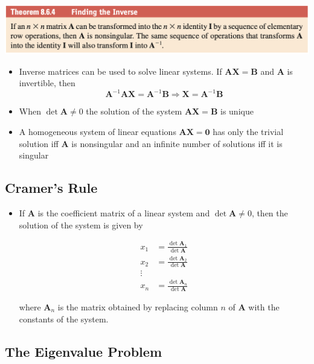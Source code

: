 \documentclass{article}
\begin{document}
\includegraphics[scale=0.443]{row-operations-inverse}

\begin{itemize}
  \item Inverse matrices can be used to solve linear systems. If $\mathbf{A} \mathbf{X} = \mathbf{B}$ and $\mathbf{A}$ is invertible, then \[\mathbf{A}^{-1} \mathbf{A} \mathbf{X} = \mathbf{A}^{-1} \mathbf{B} \Rightarrow \mathbf{X} = \mathbf{A}^{-1} \mathbf{B}\]

  \item When $\det \mathbf{A} \ne 0$ the solution of the system $\mathbf{A} \mathbf{X} = \mathbf{B}$ is unique

  \item A homogeneous system of linear equations $\mathbf{A} \mathbf{X} = \mathbf{0}$ has only the trivial solution iff $\mathbf{A}$ is nonsingular and an infinite number of solutions iff it is singular
\end{itemize}

\subsection{Cramer’s Rule}

\begin{itemize}
  \item If $\mathbf{A}$ is the coefficient matrix of a linear system and $\det \mathbf{A} \ne 0$, then the solution of the system is given by

        \begin{align*}
          x_1 & = \frac{\det \mathbf{A}_1}{\det \mathbf{A}} \\
          x_2 & = \frac{\det \mathbf{A}_2}{\det \mathbf{A}} \\
          \vdots                                            \\
          x_n & = \frac{\det \mathbf{A}_n}{\det \mathbf{A}}
        \end{align*}

        where $\mathbf{A}_n$ is the matrix obtained by replacing column $n$ of $\mathbf{A}$ with the constants of the system.
\end{itemize}

\subsection{The Eigenvalue Problem}
\end{document}
